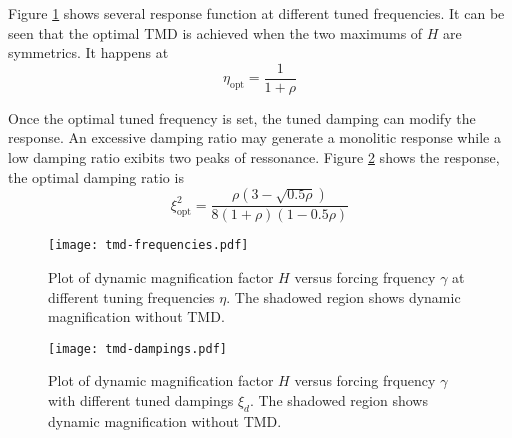 \documentclass{article}
\begin{document}
Figure \ref{H-gamma_eta} shows several response function at different tuned frequencies. It can be seen that the optimal TMD is achieved when the two maximums of $H$ are symmetrics. It happens at
$$
\eta_\text{opt} = \frac{1}{1+\rho}
$$

Once the optimal tuned frequency is set, the tuned damping can modify the response. An excessive damping ratio may generate a monolitic response while a low damping ratio exibits two peaks of ressonance. Figure \ref{H-gamma_xi} shows the response, the optimal damping ratio is
$$
\xi_\text{opt}^2 = \frac{\rho(3-\sqrt{0.5\rho})}{8(1+\rho)(1-0.5\rho)}
$$

\begin{figure}
    \centering
    \texttt{[image: tmd-frequencies.pdf]}
    \caption{Plot of dynamic magnification factor $H$ versus forcing frquency $\gamma$ at different tuning frequencies $\eta$. The shadowed region shows dynamic magnification without TMD.}
    \label{H-gamma_eta}
\end{figure}


\begin{figure}
    \centering
    \texttt{[image: tmd-dampings.pdf]}
    \caption{Plot of dynamic magnification factor $H$ versus forcing frquency $\gamma$ with different tuned dampings $\xi_d$. The shadowed region shows dynamic magnification without TMD.}
    \label{H-gamma_xi}
\end{figure}
\end{document}
